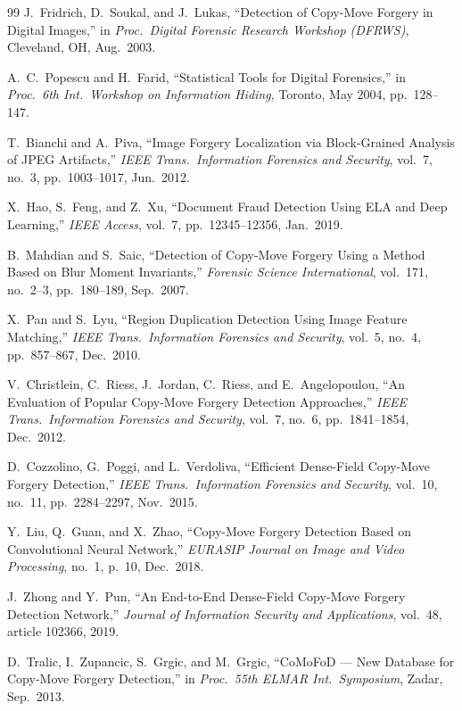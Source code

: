 \documentclass[12pt,a4paper,oneside]{report}
\begin{document}
\begin{thebibliography}{99}
J.~Fridrich, D.~Soukal, and J.~Lukas,
``Detection of Copy-Move Forgery in Digital Images,''
in \textit{Proc.\ Digital Forensic Research Workshop (DFRWS)},
Cleveland, OH, Aug.\ 2003.
 
A.~C.~Popescu and H.~Farid,
``Statistical Tools for Digital Forensics,''
in \textit{Proc.\ 6th Int.\ Workshop on Information Hiding},
Toronto, May 2004, pp.~128--147.
 
T.~Bianchi and A.~Piva,
``Image Forgery Localization via Block-Grained Analysis of JPEG Artifacts,''
\textit{IEEE Trans.\ Information Forensics and Security},
vol.~7, no.~3, pp.~1003--1017, Jun.\ 2012.
 
X.~Hao, S.~Feng, and Z.~Xu,
``Document Fraud Detection Using ELA and Deep Learning,''
\textit{IEEE Access}, vol.~7, pp.~12345--12356, Jan.\ 2019.
 
B.~Mahdian and S.~Saic,
``Detection of Copy-Move Forgery Using a Method Based on Blur Moment Invariants,''
\textit{Forensic Science International},
vol.~171, no.~2--3, pp.~180--189, Sep.\ 2007.
 
X.~Pan and S.~Lyu,
``Region Duplication Detection Using Image Feature Matching,''
\textit{IEEE Trans.\ Information Forensics and Security},
vol.~5, no.~4, pp.~857--867, Dec.\ 2010.
 
V.~Christlein, C.~Riess, J.~Jordan, C.~Riess, and E.~Angelopoulou,
``An Evaluation of Popular Copy-Move Forgery Detection Approaches,''
\textit{IEEE Trans.\ Information Forensics and Security},
vol.~7, no.~6, pp.~1841--1854, Dec.\ 2012.
 
D.~Cozzolino, G.~Poggi, and L.~Verdoliva,
``Efficient Dense-Field Copy-Move Forgery Detection,''
\textit{IEEE Trans.\ Information Forensics and Security},
vol.~10, no.~11, pp.~2284--2297, Nov.\ 2015.
 
Y.~Liu, Q.~Guan, and X.~Zhao,
``Copy-Move Forgery Detection Based on Convolutional Neural Network,''
\textit{EURASIP Journal on Image and Video Processing},
no.~1, p.~10, Dec.\ 2018.
 
J.~Zhong and Y.~Pun,
``An End-to-End Dense-Field Copy-Move Forgery Detection Network,''
\textit{Journal of Information Security and Applications},
vol.~48, article 102366, 2019.
 
D.~Tralic, I.~Zupancic, S.~Grgic, and M.~Grgic,
``CoMoFoD --- New Database for Copy-Move Forgery Detection,''
in \textit{Proc.\ 55th ELMAR Int.\ Symposium}, Zadar, Sep.\ 2013.
 

\end{thebibliography}
\end{document}
